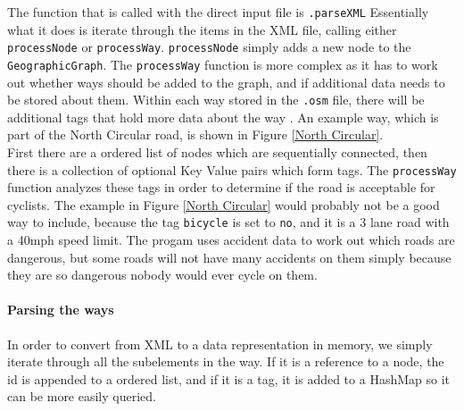 \documentclass[11pt,twoside,a4paper]{report}
\begin{document}
The function that is called with the direct input file is \texttt{.parseXML} 
Essentially what it does is iterate through the items in the XML file, calling either \texttt{processNode} or \texttt{processWay}. \texttt{processNode} simply adds a new node to the \texttt{GeographicGraph}.
The \texttt{processWay} function is more complex as it has to work out whether ways should be added to the graph, and if additional data needs to be stored about them. Within each way stored in the \texttt{.osm} file,
there will be additional tags that hold more data about the way \cite{osmhighwayspage}. An example way, which is part of the North Circular road, is shown in Figure \ref{North Circular}.\\
First there are a ordered list of nodes which are sequentially connected, then there is a collection of optional Key Value pairs which form tags. The \texttt{processWay}
function analyzes these tags in order to determine if the road is acceptable for cyclists. The example in Figure  \ref{North Circular}
would probably not be a good way to include, because the tag \texttt{bicycle} is set to \texttt{no}, and it is a 3 lane road with a 40mph speed limit. The progam uses 
accident data to work out which roads are dangerous, but some roads will not have many accidents on them simply because they are so dangerous nobody would ever cycle on them. 
\paragraph{Parsing the ways}
In order to convert from XML to a data representation in memory, we simply iterate through all the subelements in the way. If it is a reference to a node, the id is appended to a ordered list,
and if it is a tag, it is added to a HashMap so it can be more easily queried. 
\end{document}
